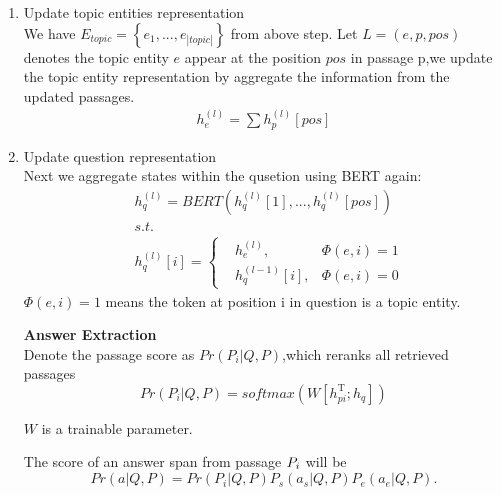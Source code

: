 \documentclass[sigconf]{acmart}
\begin{document}
\begin{enumerate}[(1)]
	    \item Update topic entities representation\\
	    We have $E_{topic}=\left\{e_1,...,e_{|topic|}\right\}$ from above step. 
	    Let $L = \left(e,p,pos\right)$ denotes the topic entity $e$ appear at the position $pos$ in passage p,we update the topic entity representation by aggregate the information from the updated passages.
	    \begin{displaymath}
	    	\begin{aligned}
	    		h^{(l)}_{e} = \sum h_p^{(l)}[pos]
    		\end{aligned}
   		\end{displaymath}
   	
   		\item Update question representation\\
	    Next we aggregate states within the qusetion using BERT again:
	    \begin{displaymath}
	    	\begin{aligned}
	    		&h_{q}^{(l)} = BERT(h_q^{(l)}[1],...,h_q^{(l)}[pos])\\
	    		&s.t.\\
	    		&h_q^{(l)}[i] = \left\{
	    		\begin{aligned}
		    		&h^{(l)}_{e}  		 , & {\Phi(e,i) = 1} \\
		    		&h_q^{(l-1)}[i]     ,& { \Phi(e,i) = 0 }
		    	\end{aligned}
	    		\right.
	    	\end{aligned}
	    \end{displaymath}
    	$\Phi(e,i)=1$ means the token at position i in question  is a topic entity.
		

	
	\textbf{ Answer Extraction }\\		
		Denote the passage score as $Pr(P_i|Q, P)$,which reranks all retrieved passages
			\begin{displaymath}
				Pr(P_i|Q, P) = softmax( W[h_{pi}^\mathrm{ T };h_q] )
			\end{displaymath}
				
		$W$ is a trainable parameter.
		
		The score of an answer span from passage $\MakeUppercase{p}_i$ will be
				\begin{displaymath}
				Pr(a| Q, P) = 	Pr(P_i|Q, P)P_s(a_s|Q, P)P_e(a_e|Q, P).
				\end{displaymath}
		
	\end{enumerate} 
   
   	

	
	
	
	
	
	
\end{document}
